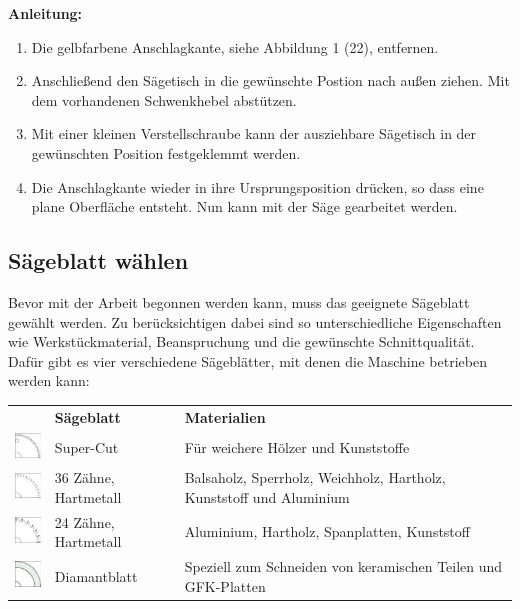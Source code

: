 \documentclass{\basedir/fablab-document}
\begin{document}
\textbf{Anleitung:} \\
\renewcommand{\labelenumi}{\alph{enumi})}
\begin{enumerate}
	\item Die gelbfarbene Anschlagkante, siehe Abbildung 1 (22), entfernen.
	\item Anschließend den Sägetisch in die gewünschte Postion nach außen ziehen. Mit dem vorhandenen Schwenkhebel abstützen.
	\item Mit einer kleinen Verstellschraube kann der ausziehbare Sägetisch in der gewünschten Position festgeklemmt werden.
	\item Die Anschlagkante wieder in ihre Ursprungsposition drücken, so dass eine plane Oberfläche entsteht. Nun kann mit der Säge gearbeitet werden.
\end{enumerate}

\subsection{Sägeblatt  wählen}
Bevor mit der Arbeit begonnen werden kann, muss das geeignete Sägeblatt gewählt werden. Zu berücksichtigen dabei sind so unterschiedliche Eigenschaften wie Werkstückmaterial, Beanspruchung und die gewünschte Schnittqualität. Dafür gibt es vier verschiedene Sägeblätter, mit denen die Maschine betrieben werden kann:

\begin{table}[h]
	\centering
	\begin{tabular}{lll}
		&\textbf{Sägeblatt}  & \textbf{Materialien} \\
		\includegraphics[width=1cm]{bilder/super_cut.pdf}&Super-Cut & Für weichere Hölzer und Kunststoffe \\
		\includegraphics[width=1cm]{bilder/36zahne.pdf}&36 Zähne, Hartmetall &  Balsaholz, Sperrholz, Weichholz, Hartholz, Kunststoff und Aluminium\\
		\includegraphics[width=1cm]{bilder/24zahne.pdf}&24 Zähne, Hartmetall & Aluminium, Hartholz, Spanplatten, Kunststoff \\
		\includegraphics[width=1cm]{bilder/diamant.pdf}&Diamantblatt & Speziell zum Schneiden von keramischen Teilen und GFK-Platten
	\end{tabular}
\end{table}
\end{document}
